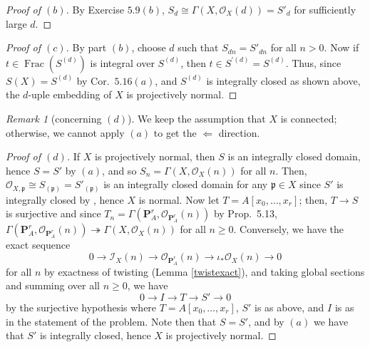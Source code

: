\documentclass[10pt]{article}
\theoremstyle{definition}
\theoremstyle{remark}
\newtheorem*{remark}{Remark}
\numberwithin{equation}{section}
\numberwithin{figure}{subsubsection}
\DeclareMathOperator{\Frac}{Frac}
\newcommand{\II}{\mathscr{I}}
\newcommand{\OO}{\mathcal{O}}
\begin{document}
\begin{proof}[Proof of $(b)$]
  By Exercise $5.9(b)$, $S_d \cong \Gamma(X,\OO_X(d)) = S'_d$ for sufficiently large $d$.
\end{proof}
\begin{proof}[Proof of $(c)$]
  By part $(b)$, choose $d$ such that $S_{dn} = S'_{dn}$ for all $n > 0$. Now if $t \in \Frac(S^{(d)})$ is integral over $S^{(d)}$, then $t \in S^{\prime(d)} = S^{(d)}$. Thus, since $S(X) = S^{(d)}$ by Cor.~$5.16(a)$, and $S^{(d)}$ is integrally closed as shown above, the $d$-uple embedding of $X$ is projectively normal.
\end{proof}
\begin{remark}[concerning $(d)$]
  We keep the assumption that $X$ is connected; otherwise, we cannot apply $(a)$ to get the $\Leftarrow$ direction.
\end{remark}
\begin{proof}[Proof of $(d)$]
  If $X$ is projectively normal, then $S$ is an integrally closed domain, hence $S = S'$ by $(a)$, and so $S_n = \Gamma(X,\OO_X(n))$ for all $n$. Then, $\OO_{X,\mathfrak{p}} \cong S_{(\mathfrak{p})} = S'_{(\mathfrak{p})}$ is an integrally closed domain for any $\mathfrak{p} \in X$ since $S'$ is integrally closed by \cite[Prop.~5.13]{AM69}, hence $X$ is normal. Now let $T = A[x_0,\ldots,x_r]$; then, $T \to S$ is surjective and since $T_n = \Gamma(\mathbf{P}^r_A,\OO_{\mathbf{P}^r_A}(n))$ by Prop.~5.13, $\Gamma(\mathbf{P}^r_A,\OO_{\mathbf{P}^r_A}(n)) \twoheadrightarrow \Gamma(X,\OO_X(n))$ for all $n \ge 0$. Conversely, we have the exact sequence
  \begin{equation*}
    0 \longrightarrow \II_X(n) \longrightarrow \OO_{\mathbf{P}^r_A}(n) \longrightarrow \iota_*\OO_X(n) \longrightarrow 0
  \end{equation*}
  for all $n$ by exactness of twisting (Lemma \ref{twistexact}), and taking global sections and summing over all $n \ge 0$, we have
  \begin{equation*}
    0 \longrightarrow I \longrightarrow T \longrightarrow S' \longrightarrow 0
  \end{equation*}
  by the surjective hypothesis where $T = A[x_0,\ldots,x_r]$, $S'$ is as above, and $I$ is as in the statement of the problem. Note then that $S = S'$, and by $(a)$ we have that $S'$ is integrally closed, hence $X$ is projectively normal.
\end{proof}
\end{document}
